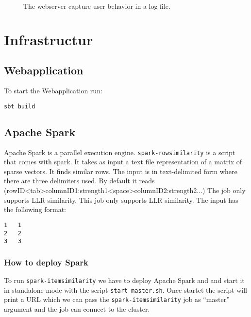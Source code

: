 \begin{figure}
\centering
{}
\caption{The webserver capture user behavior in a log file.}
\end{figure}

\section{Infrastructur}
\label{sec:infrastructur}

\subsection{Webapplication}
\label{sec:web}

To start the Webapplication run:
\begin{verbatim}
sbt build 
\end{verbatim}

\subsection{Apache Spark}
\label{sec:spark}
Apache Spark is a parallel execution engine.
\verb|spark-rowsimilarity| is a script that comes with spark. It takes as input a text file representation of a matrix of sparse vectors. It finds similar rows. The input is in text-delimited form where there are three delimiters used. By default it reads (rowID<tab>columnID1:strength1<space>columnID2:strength2...) The job only supports LLR similarity. This job only supports LLR similarity.
The input has the following format:
\begin{verbatim}
1	1
2	2
3	3 
\end{verbatim}

\subsubsection{How to deploy Spark}
\label{sec:sparkdeploy}

To run \verb|spark-itemsimilarity| we have to deploy Apache Spark and and start it in standalone mode with the script \verb|start-master.sh|. Once startet the script will print a URL which we can pass the \verb|spark-itemsimilarity| job as ``master'' argument and the job can connect to the cluster. 


